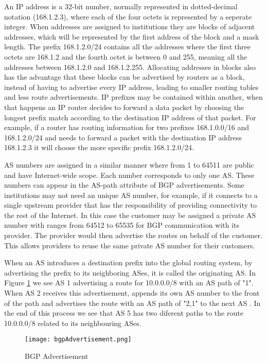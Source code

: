 \documentclass[11pt]{report}
\begin{document}
	An IP address is a 32-bit number, normally represented in dotted-decimal notation (168.1.2.3), where each of the four octets is represented by a seperate integer. When addresses are assigned to institutions they are blocks of adjacent addresses, which will be represented by the first address of the block and a mask length. The prefix 168.1.2.0/24 contains all the addresses where the first three octets are 168.1.2 and the fourth octet is between 0 and 255, meaning all the addresses between 168.1.2.0 and 168.1.2.255. Allocating addresses in blocks also has the advantage that these blocks can be advertised by routers as a block, instead of having to advertise every IP address, leading to smaller routing tables and less route advertisements. IP prefixes may be contained within another, when that happens an IP router decides to forward a data packet by choosing the longest prefix match according to the destination IP address of that packet. For example, if a router has routing information for two prefixes 168.1.0.0/16 and 168.1.2.0/24 and needs to forward a packet with the destination IP address 168.1.2.3 it will choose the more specific prefix 168.1.2.0/24. 

AS numbers are assigned in a similar manner where from 1 to 64511 are public and have Internet-wide scope. Each number corresponds to only one AS. These numbers can appear in the AS-path attribute of BGP advertisements. Some institutions may not need an unique AS number, for example, if it connects to a single upstream provider that has the responsibility of providing connectivity to the rest of the Internet. In this case the customer may be assigned a private AS number with ranges from 64512 to 65535 for BGP communication with its provider. The provider would then advertise the routes on behalf of the customer. This allows providers to reuse the same private AS number for their customers.

When an AS introduces a destination prefix into the global routing system, by advertising the prefix to its neighboring ASes, it is called the originating AS. In Figure \ref{fig:bgpAdvertisement} we see AS 1 advertising a route for 10.0.0.0/8 with an AS path of "1". When AS 2 receives this advertisement, appends its own AS number to the front of the path and advertises the route with an AS path of "2,1" to the next AS . In the end of this process we see that AS 5 has two diferent paths to the route 10.0.0.0/8 related to its neighbouring ASes.

\begin{figure}[h!]
\centering
\texttt{[image: bgpAdvertisement.png]}
\caption{BGP Advertisement}
\label{fig:bgpAdvertisement}
\end{figure}
\end{document}
